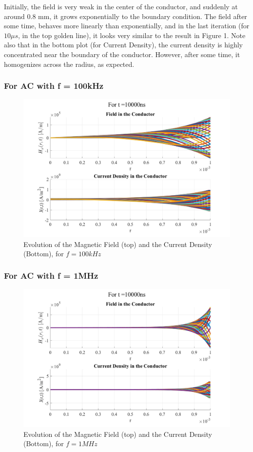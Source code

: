 \documentclass{article}
\begin{document}
Initially, the field is very weak in the center of the conductor, and suddenly at around 0.8 mm, it grows exponentially to the boundary condition. The field after some time, behaves more linearly than exponentially, and in the last iteration (for $10 \mu s$, in the top golden line), it looks very similar to the result in Figure 1. Note also that in the bottom plot (for Current Density), the current density is highly concentrated near the boundary of the conductor. However, after some time, it homogenizes across the radius, as expected.

\subsubsection{For AC with f = 100kHz}

\begin{figure}[ht]
\centering
\includegraphics[scale=0.235]{AC_100kHz}
\caption{Evolution of the Magnetic Field (top) and the Current Density (Bottom), for $f = 100kHz$}
\end{figure}

\subsubsection{For AC with f = 1MHz}
\begin{figure}[ht]
\centering
\includegraphics[scale=0.235]{AC_1MHz}
\caption{Evolution of the Magnetic Field (top) and the Current Density (Bottom), for $f = 1MHz$}
\end{figure}
\pagebreak
\end{document}
